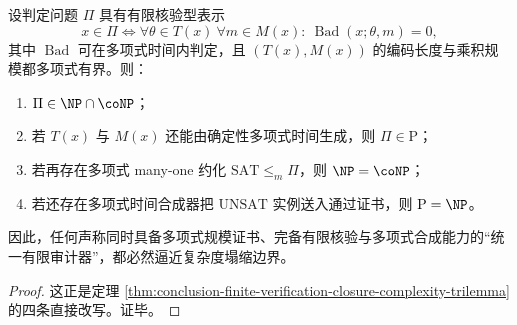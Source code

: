 \begin{corollary}[统一有限审计闭包的复杂度屏障]\label{cor:conclusion-boundary-finite-audit-complexity-barrier}
设判定问题 \(\Pi\) 具有有限核验型表示
\[
x\in \Pi
\iff
\forall \theta\in T(x)\ \forall m\in M(x):\ \operatorname{Bad}(x;\theta,m)=0,
\]
其中 \(\operatorname{Bad}\) 可在多项式时间内判定，且 \((T(x),M(x))\) 的编码长度与乘积规模都多项式有界。则：
\begin{enumerate}
  \item \(\Pi\in \NP\cap \coNP\)；
  \item 若 \(T(x)\) 与 \(M(x)\) 还能由确定性多项式时间生成，则 \(\Pi\in \mathrm P\)；
  \item 若再存在多项式 many-one 约化 \(\mathrm{SAT}\le_m \Pi\)，则 \(\NP=\coNP\)；
  \item 若还存在多项式时间合成器把 \(\mathrm{UNSAT}\) 实例送入通过证书，则 \(\mathrm P=\NP\)。
\end{enumerate}
因此，任何声称同时具备多项式规模证书、完备有限核验与多项式合成能力的“统一有限审计器”，都必然逼近复杂度塌缩边界。
\end{corollary}
\begin{proof}
这正是定理 \ref{thm:conclusion-finite-verification-closure-complexity-trilemma} 的四条直接改写。证毕。
\end{proof}

